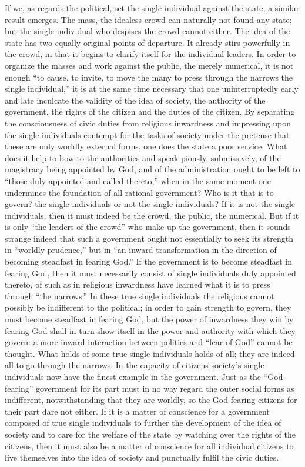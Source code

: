 \documentclass[12pt,a4paper,openany]{book}
\newcommand{\opage}[1]{\marginnote{\footnotesize\textit{[#1]}}}
\begin{document}
If we, as regards the political, set the single individual
against the state, a similar result emerges. The mass,
the idealess crowd can naturally not found any
state; but the single individual who despises the crowd cannot
either. The idea of the state has two equally original
points of departure. It already stirs powerfully in the crowd,
in that it begins to clarify itself for the individual
leaders. In order to organize the masses and work against the
public, the merely numerical, it is not enough ``to cause,
to invite, to move the many to press through
\setcounter{footnote}{0}%
\opage{33}the narrows the single individual,'' it is at the same time necessary
that one uninterruptedly early and late inculcate
the validity of the idea of society, the authority of the government, the
rights of the citizen and the duties of the citizen. By separating
the consciousness of civic duties from religious
inwardness and impressing upon the single individuals contempt for the tasks of society
under the pretense that these are only
worldly external forms, one does the state a poor
service. What does it help to bow to the authorities
and speak piously, submissively, of the magistracy being
appointed by God, and of the administration ought to be left to ``those duly
appointed and called thereto,'' when in the same
moment one undermines the foundation of all rational government?
Who is it that is to govern? the single individuals or
not the single individuals? If it is not the single individuals, then
it must indeed be the crowd, the public, the numerical.
But if it is only ``the leaders of the crowd'' who make up
the government, then it sounds strange indeed that such a
government ought not essentially to seek its strength in
``worldly prudence,'' but in ``an inward transformation in the
direction of becoming steadfast in fearing God.'' If the government is to
become steadfast in fearing God, then it must necessarily
consist of single individuals duly appointed thereto,
of such as in religious inwardness have learned
what it is to press through ``the narrows.'' In these
true single individuals the religious cannot possibly be
indifferent to the political; in order to gain strength to
govern, they must become steadfast in fearing God, but the
power of inwardness they win by fearing God shall in turn
show itself in the power and authority with which
they govern: a more inward interaction between politics
\setcounter{footnote}{0}%
\opage{34}and ``fear of God'' cannot be thought. What holds
of some true single individuals holds of all; they are indeed
all to go through the narrows. In the capacity of citizens
society's single individuals now have the finest
example in the government. Just as the ``God-fearing'' government
for its part must in no way regard the outer
social forms as indifferent, notwithstanding that they are worldly,
so the God-fearing citizens for their part dare not
either. If it is a matter of conscience for a government composed of true
single individuals to further the development of the idea of society
and to care for the welfare of the state by watching over
the rights of the citizens, then it must also be a matter of conscience for all individual citizens to live themselves into the
idea of society and punctually fulfil the civic duties.
\end{document}
